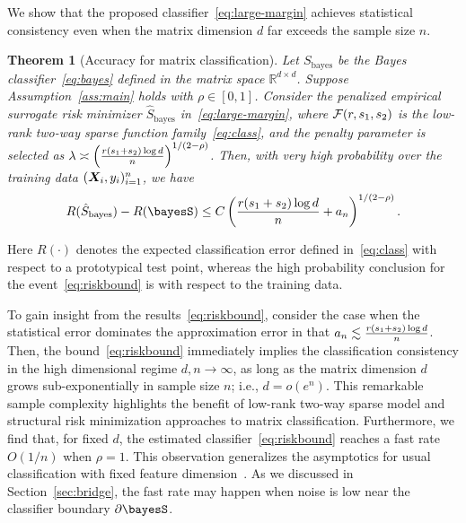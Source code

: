 \documentclass[12pt]{article}
\newtheorem{thm}{Theorem}[section]
\begin{document}
We show that the proposed classifier~\eqref{eq:large-margin} achieves statistical consistency even when the matrix dimension $d$ far exceeds the sample size $n$. 

\begin{thm}[Accuracy for matrix classification]\label{thm:main} 
Let $S_{\text{bayes}}$ be the Bayes classifier~\eqref{eq:bayes} defined in the matrix space $\mathbb{R}^{d\times d}$. Suppose Assumption~\ref{ass:main} holds with $\rho\in[0,1]$. Consider the penalized empirical surrogate risk minimizer $\hat S_{\text{bayes}}$ in~\eqref{eq:large-margin}, where $\mathcal{F}(r,s_1,s_2)$ is the low-rank two-way sparse function family~\eqref{eq:class}, and the penalty parameter is selected as $\lambda \asymp \left({r(s_1+s_2)\log d\over n}\right)^{1/ (2-\rho)}$. Then, with very high probability over the training data $(\bm X_i,y_i)_{i=1}^n$, we have
\begin{equation}\label{eq:riskbound}
R(\hat S_{\text{bayes}}) - R(\bayesS) \leq C\left({r(s_1+s_2)\log d \over n}+a_n\right)^{1/ ( 2-\rho)}.
\end{equation}
\end{thm}
Here $R(\cdot)$ denotes the expected classification error defined in~\eqref{eq:class} with respect to a prototypical test point, whereas the high probability conclusion for the event~\eqref{eq:riskbound} is with respect to the training data. 

To gain insight from the results~\eqref{eq:riskbound}, consider the case when the statistical error dominates the approximation error in that $a_n \lesssim {r(s_1+s_2)\log d \over n}$. Then, the bound~\eqref{eq:riskbound} immediately implies the classification consistency in the high dimensional regime $d,n\to \infty$, as long as the matrix dimension $d$ grows sub-exponentially in sample size $n$; i.e., $d=o(e^n)$. This remarkable sample complexity highlights the benefit of low-rank two-way sparse model and structural risk minimization approaches to matrix classification. Furthermore, we find that, for fixed $d$, the estimated classifier~\eqref{eq:riskbound} reaches a fast rate $O(1/n)$ when $\rho=1$. This observation generalizes the asymptotics for usual classification with fixed feature dimension~\citep{tsybakov2004optimal,audibert2007fast,tsybakov2006discussion}. As we discussed in Section~\ref{sec:bridge}, the fast rate may happen when noise is low near the classifier boundary $\partial \bayesS$. 
\end{document}
